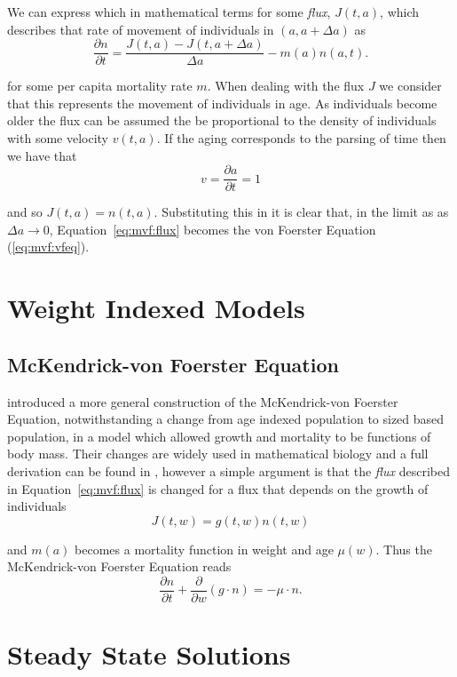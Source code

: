 \documentclass[../main.tex]{subfiles}
\begin{document}
  We can express which in mathematical terms for some \emph{flux}, $J(t, a)$, which describes that rate of movement of individuals in $(a, a + \Delta a)$ as
  \begin{equation}\label{eq:mvf:flux}
    \frac{\partial n}{\partial t} = \frac{J(t, a) - J(t, a + \Delta a)}{\Delta a} - m(a) n(a, t).
  \end{equation}

  for some per capita mortality rate $m$. When dealing with the flux $J$ we consider that this represents the movement of individuals in age. As individuals become older the flux can be assumed the be proportional to the density of individuals with some velocity $v(t, a)$. If the aging corresponds to the parsing of time then we have that
  $$ v = \frac{\partial a}{\partial t} = 1$$

  and so $J(t, a) = n(t, a)$. Substituting this in it is clear that, in the limit as as $\Delta a \to 0$, Equation~\ref{eq:mvf:flux} becomes the von Foerster Equation (\ref{eq:mvf:vfeq}).

  \section{Weight Indexed Models}
  \subsection{McKendrick-von Foerster Equation}
  \cite{silvert1978} introduced a more general construction of the McKendrick-von Foerster Equation, notwithstanding a change from age indexed population to sized based population, in a model which allowed growth and mortality to be functions of body mass. Their changes are widely used in mathematical biology and a full derivation can be found in \cite{silvert1978}, however a simple argument is that the \emph{flux} described in Equation~\ref{eq:mvf:flux} is changed for a flux that depends on the growth of individuals
  $$J(t, w) = g(t, w)n(t, w)$$

  and $m(a)$ becomes a mortality function in weight and age $\mu(w)$. Thus the McKendrick-von Foerster Equation reads
  \begin{equation}\label{eq:mvf:mvf}
    \frac{\partial n}{\partial t} + \frac{\partial}{\partial w} \left(g \cdot n \right) = - \mu \cdot n.
  \end{equation}

  \section{Steady State Solutions}\label{sec:mvf:steadystate}
\end{document}

